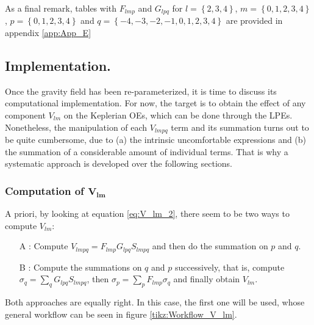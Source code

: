 		\indent As a final remark, tables with $F_{lmp}$ and $G_{lpq}$ for $l = \left\{2, 3, 4\right\}$, $m = \left\{0, 1, 2, 3, 4\right\}$, $p = \left\{0, 1, 2, 3, 4\right\}$ and $q  = \left\{-4, -3, -2, -1, 0, 1, 2, 3, 4\right\}$ are provided in appendix \ref{app:App_E}
	\subsection{Implementation.}
	\indent Once the gravity field has been re-parameterized, it is time to discuss its computational implementation. For now, the target is to obtain the effect of any component $V_{lm}$ on the Keplerian OEs, which can be done through the LPEs. Nonetheless, the manipulation of each $V_{lmpq}$ term and its summation turns out to be quite cumbersome, due to (a) the intrinsic uncomfortable expressions and (b) the summation of a considerable amount of individual terms. That is why a systematic approach is developed over the following sections.
		
		\subsubsection{Computation of $\bm{V_{lm}}$}
		\indent A priori, by looking at equation \eqref{eq:V_lm_2}, there seem to be two ways to compute $V_{lm}$:
		\begin{itemize}
		\item[\textcolor{GMVred}{A}]: Compute $V_{lmpq} = F_{lmp} G_{lpq} S_{lmpq}$ and then do the summation on $p$ and $q$.
		\item[\textcolor{GMVred}{B}]: Compute the summations on $q$ and $p$ successively, that is, compute $\sigma_q = \sum_{q} G_{lpq} S_{lmpq}$, then $\sigma_p = \sum_{p} F_{lmp} \sigma_q$ and finally obtain $V_{lm}$.
		\end{itemize}
		\indent Both approaches are equally right. In this case, the first one will be used, whose general workflow can be seen in figure \ref{tikz:Workflow_V_lm}. 
		
